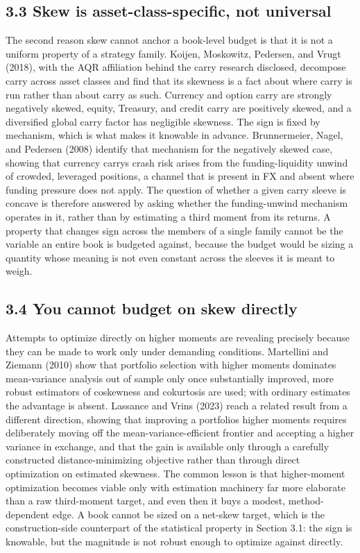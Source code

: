 \documentclass[12pt, a4paper]{article}
\begin{document}
\subsection*{3.3 Skew is asset-class-specific, not
universal}\label{skew-is-asset-class-specific-not-universal}

The second reason skew cannot anchor a book-level budget is that it is
not a uniform property of a strategy family. Koijen, Moskowitz,
Pedersen, and Vrugt (2018), with the AQR affiliation behind the carry
research disclosed, decompose carry across asset classes and find that
its skewness is a fact about where carry is run rather than about carry
as such. Currency and option carry are strongly negatively skewed,
equity, Treasury, and credit carry are positively skewed, and a
diversified global carry factor has negligible skewness. The sign is
fixed by mechanism, which is what makes it knowable in advance.
Brunnermeier, Nagel, and Pedersen (2008) identify that mechanism for the
negatively skewed case, showing that currency carry\textquotesingle s
crash risk arises from the funding-liquidity unwind of crowded,
leveraged positions, a channel that is present in FX and absent where
funding pressure does not apply. The question of whether a given carry
sleeve is concave is therefore answered by asking whether the
funding-unwind mechanism operates in it, rather than by estimating a
third moment from its returns. A property that changes sign across the
members of a single family cannot be the variable an entire book is
budgeted against, because the budget would be sizing a quantity whose
meaning is not even constant across the sleeves it is meant to weigh.

\subsection*{3.4 You cannot budget on skew
directly}\label{you-cannot-budget-on-skew-directly}

Attempts to optimize directly on higher moments are revealing precisely
because they can be made to work only under demanding conditions.
Martellini and Ziemann (2010) show that portfolio selection with higher
moments dominates mean-variance analysis out of sample only once
substantially improved, more robust estimators of coskewness and
cokurtosis are used; with ordinary estimates the advantage is absent.
Lassance and Vrins (2023) reach a related result from a different
direction, showing that improving a portfolio\textquotesingle s higher
moments requires deliberately moving off the mean-variance-efficient
frontier and accepting a higher variance in exchange, and that the gain
is available only through a carefully constructed distance-minimizing
objective rather than through direct optimization on estimated skewness.
The common lesson is that higher-moment optimization becomes viable only
with estimation machinery far more elaborate than a raw third-moment
target, and even then it buys a modest, method-dependent edge. A book
cannot be sized on a net-skew target, which is the construction-side
counterpart of the statistical property in Section 3.1: the sign is
knowable, but the magnitude is not robust enough to optimize against
directly.
\end{document}
